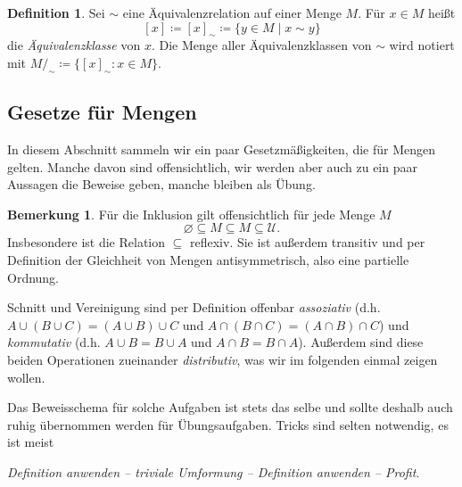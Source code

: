 \documentclass[11pt, a4paper]{article}
\theoremstyle{definition}
\newtheorem{definition}{Definition}[section]
\newtheorem*{remark*}{Bemerkung}
\theoremstyle{plain}
\numberwithin{equation}{section}
\let\emptyset\varnothing
\begin{document}
\begin{definition}\label{def:equivalenceclass}
	Sei \( \sim \) eine Äquivalenzrelation auf einer Menge \( M \). Für \( x \in M \) heißt
	\[
		[x] \coloneqq [x]_\sim \coloneqq \{ y \in M \mid x \sim y \}
	\]
	die \textit{Äquivalenzklasse} von \( x \). Die Menge aller Äquivalenzklassen von \( \sim \) wird notiert mit \( M /_\sim \coloneqq \{ [x]_\sim : x \in M \} \).
\end{definition}



\subsection{Gesetze für Mengen}\label{sec:pre_setlaws}
In diesem Abschnitt sammeln wir ein paar Gesetzmäßigkeiten, die für Mengen gelten. Manche davon sind offensichtlich, wir werden aber auch zu ein paar Aussagen die Beweise geben, manche bleiben als Übung.
\begin{remark*}
	Für die Inklusion gilt offensichtlich für jede Menge \( M \)
	\[
		\emptyset \subseteq M \subseteq M \subseteq \mathcal{U}.
	\]
	Insbesondere ist die Relation \( \subseteq \) reflexiv. Sie ist außerdem transitiv und per Definition der Gleichheit von Mengen antisymmetrisch, also eine partielle Ordnung.\par
	Schnitt und Vereinigung sind per Definition offenbar \textit{assoziativ} (d.h. \( A \cup (B \cup C) = (A \cup B) \cup C \) und \( A \cap (B \cap C) = (A \cap B) \cap C \)) und \textit{kommutativ} (d.h. \( A \cup B = B \cup A \) und \( A \cap B = B \cap A \)). Außerdem sind diese beiden Operationen zueinander \textit{distributiv}, was wir im folgenden einmal zeigen wollen. 
\end{remark*}
Das Beweisschema für solche Aufgaben ist stets das selbe und sollte deshalb auch ruhig übernommen werden für Übungsaufgaben. Tricks sind selten notwendig, es ist meist
\begin{center}
	\textit{Definition anwenden -- triviale Umformung -- Definition anwenden -- Profit}.
\end{center}
\end{document}
